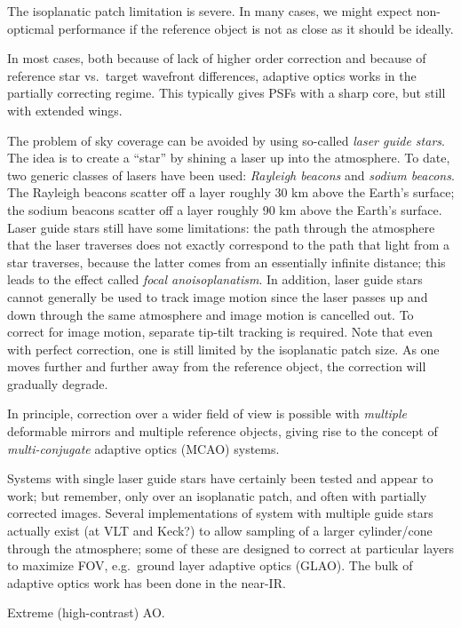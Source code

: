\documentclass[12pt]{article}
\begin{document}
The isoplanatic patch limitation is severe. In many cases, we might
expect non-opticmal performance if the reference object is not as
close as it should be ideally.

In most cases, both because of lack of higher order correction and
because of reference star vs.\ target wavefront differences, adaptive
optics works in the partially correcting regime. This typically gives
PSFs with a sharp core, but still with extended wings.

The problem of sky coverage can be avoided by using so-called \emph{laser
guide stars}. The idea is to create a ``star'' by shining a laser up into
the atmosphere. To date, two generic classes of lasers have been used:
\emph{Rayleigh beacons} and \emph{sodium beacons}.
The Rayleigh beacons scatter off a layer roughly 30 km above the Earth's surface;
the sodium beacons scatter off a layer roughly 90 km above the Earth's surface.
Laser guide stars still have some limitations:
the path through the atmosphere that the laser traverses does not exactly
correspond to the path that light from a star traverses, because the
latter comes from an essentially infinite distance; this leads to the
effect called \emph{focal anoisoplanatism}.
In addition, laser guide stars
cannot generally be used to track image motion since the laser passes
up and down through the same atmosphere and image motion is cancelled
out. To correct for image motion, separate tip-tilt tracking is
required. Note that even with perfect correction, one is still limited
by the isoplanatic patch size. As one moves further and further away
from the reference object, the correction will gradually degrade.

In principle, correction over a wider field of view is possible with
\emph{multiple}
deformable mirrors and multiple reference objects, giving rise to the concept
of \emph{multi-conjugate} adaptive optics (MCAO) systems.

Systems with single laser guide stars have certainly been tested and appear to
work; but remember, only over an isoplanatic patch, and often with partially
corrected images. Several implementations of system with multiple guide stars
actually exist (at VLT and Keck?) to allow sampling of a larger cylinder/cone
through the atmosphere; some of these are designed to correct at particular
layers to maximize FOV, e.g.\ ground layer adaptive optics (GLAO). The bulk of
adaptive optics work has been done in the near-IR.

Extreme (high-contrast) AO.
\end{document}
